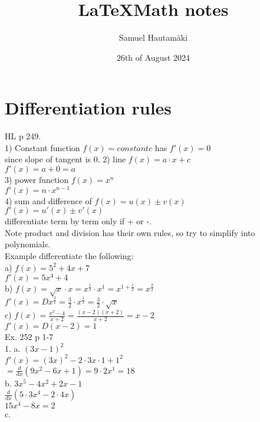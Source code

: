 \documentclass{article}
\title{\LaTeX Math notes}
\author{Samuel Hautamäki}
\date{26th of August 2024}
\begin{document}
  \maketitle
   
  \section{Differentiation rules}
  HL p 249.\\
  1) Constant function $f(x)=constant c$ has $f'(x)=0$\\
  since slope of tangent is 0.
  2) line $f(x)=a\cdot x+c$\\
  $f'(x)=a+0=a$\\
  3) power function $f(x)=x^n$\\
  $f'(x)=n\cdot x^{n-1}$\\
  4) sum and difference of $f(x)=u(x)\pm v(x)$\\
  $f'(x)=u'(x)\pm v'(x)$\\
  differentiate term by term only if + or -.\\
  Note product and division has their own rules, so try to simplify into polynomials.\\
  Example differentiate the following:\\
  a) $f(x)=5^2+4x+7$\\
  $f'(x)=5x^4+4$\\
  b) $f(x)=\sqrt{x}\cdot x = x^\frac{1}{2}\cdot x^1=x^{1+\frac{1}{2}}=x^\frac{3}{2}$\\
  $f'(x)=D x^{\frac{3}{2}}=\frac{3}{2}\cdot x^{\frac{1}{2}}=\frac{3}{2}\cdot\sqrt{x}$\\
  c) $f(x)=\frac{x^2-4}{x+2}=\frac{(x-2)(x+2)}{x+2}=x-2$\\
  $f'(x) = D (x-2)=1$\\
  Ex. 252 p 1-7\\
  1. a. $(3x-1)^2$\\
  $f'(x)=(3x)^2-2\cdot 3x\cdot 1+1^2$\\
  $=\frac{d}{dx}(9x^2-6x+1)=9\cdot 2x^1=18$\\
  b. $3x^5-4x^2+2x-1$\\
  $\frac{d}{dx}(5\cdot 3x^4-2\cdot 4x)$\\
  $15x^4-8x=2$\\
  c.  
  

   
\end{document}
